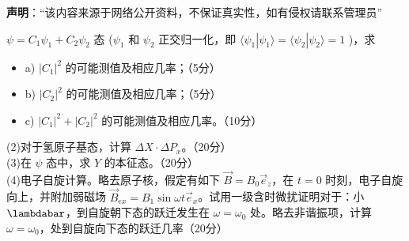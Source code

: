 
\textbf{声明}：“该内容来源于网络公开资料，不保证真实性，如有侵权请联系管理员”

\begin{enumerate}
     $\psi = C_1 \psi_1 + C_2 \psi_2$ 态 ($\psi_1$ 和 $\psi_2$ 正交归一化，即 $\langle \psi_1 | \psi_1 \rangle = \langle \psi_2 | \psi_2 \rangle = 1$ )，求
    \begin{itemize}
    \item a) $|C_1|^2$ 的可能测值及相应几率；（5分）
    \item b) $|C_2|^2$ 的可能测值及相应几率；（5分）
    \item c) $|C_1|^2 + |C_2|^2$ 的可能测值及相应几率。（10分）
   \end{itemize}
 
    (2)对于氢原子基态，计算 $\Delta X \cdot \Delta P_x$。（20分）\\
    (3)在 $\psi$ 态中，求 $Y$ 的本征态。（20分）\\
    (4)电子自旋计算。略去原子核，假定有如下 $\vec{B} = B_0 \vec{e}_z$，在 $t=0$ 时刻，电子自旋向上，并附加弱磁场 $\vec{B}_{ex} = B_1 \sin \omega t \vec{e}_x$。试用一级含时微扰证明对于：小 $\lambdabar$，到自旋朝下态的跃迁发生在 $\omega = \omega_0$ 处。略去非谐振项，计算 $\omega = \omega_0$，处到自旋向下态的跃迁几率（20分） 
     \end{enumerate}
     
